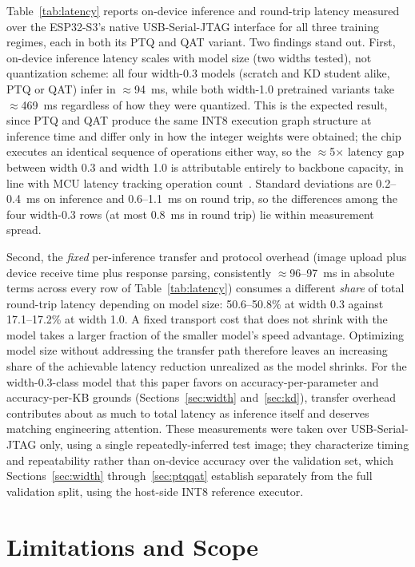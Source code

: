 \documentclass[conference]{IEEEtran}
\begin{document}
	Table~\ref{tab:latency} reports on-device inference and round-trip latency measured over the
	ESP32-S3's native USB-Serial-JTAG interface for all three training regimes, each in both its
	PTQ and QAT variant. Two findings stand out. First, on-device inference latency scales with
	model size (two widths tested), not quantization scheme: all four width-0.3 models (scratch and KD student
	alike, PTQ or QAT) infer in $\approx$94~ms, while both width-1.0 pretrained variants take
	$\approx$469~ms regardless of how they were quantized. This is the expected result, since PTQ
	and QAT produce the same INT8 execution graph structure at inference time and differ only in
	how the integer weights were obtained; the chip executes an identical sequence of operations
	either way, so the $\approx$5$\times$ latency gap between width 0.3 and width 1.0 is
	attributable entirely to backbone capacity, in line with MCU latency tracking operation count~\cite{banbury2021micronets}. Standard deviations are 0.2--0.4~ms on inference and 0.6--1.1~ms on round trip, so the differences among the four width-0.3 rows (at most 0.8~ms in round trip) lie within measurement spread.
	
	Second, the
	\emph{fixed} per-inference transfer and protocol overhead (image upload plus device receive
	time plus response parsing, consistently $\approx$96--97~ms in absolute terms across every
	row of Table~\ref{tab:latency}) consumes a different \emph{share} of total
	round-trip latency depending on model size: 50.6--50.8\% at width 0.3 against
	17.1--17.2\% at width 1.0. A fixed transport cost that does not shrink with the model takes a larger fraction of the smaller
	model's speed advantage. Optimizing model size without addressing the transfer path therefore
	leaves an increasing share of the achievable latency reduction unrealized as the model shrinks.
	For the width-0.3-class model that this paper favors on accuracy-per-parameter and
	accuracy-per-KB grounds (Sections~\ref{sec:width} and~\ref{sec:kd}), transfer overhead contributes about as much
	to total latency as inference itself and deserves matching engineering attention. These measurements were taken over USB-Serial-JTAG only, using a
	single repeatedly-inferred test image; they characterize timing and repeatability rather than
	on-device accuracy over the validation set, which Sections~\ref{sec:width} through~\ref{sec:ptqqat} establish separately
	from the full validation split, using the host-side INT8 reference executor.
	
	\section{Limitations and Scope}
	\label{sec:limits}
	
\end{document}
